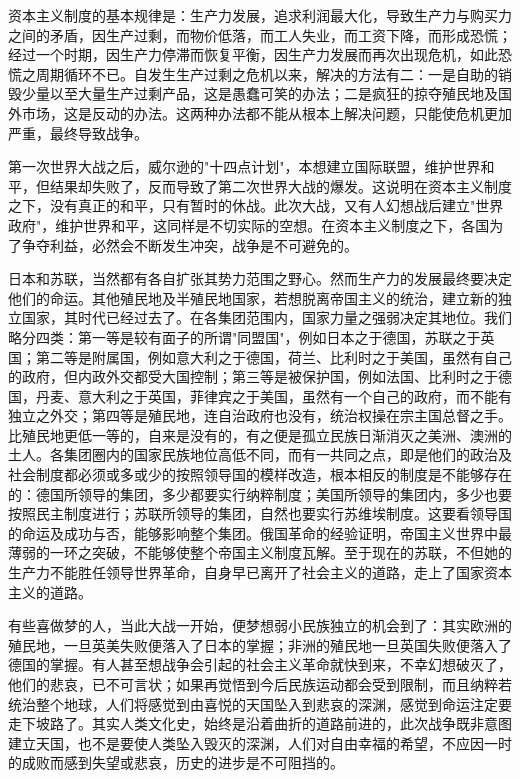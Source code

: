 \documentclass[
  openany,           %
  12pt,              %
  a4paper            %
]{ctexbook}
\begin{document}
资本主义制度的基本规律是：生产力发展，追求利润最大化，导致生产力与购买力之间的矛盾，因生产过剩，而物价低落，而工人失业，而工资下降，而形成恐慌；经过一个时期，因生产力停滞而恢复平衡，因生产力发展而再次出现危机，如此恐慌之周期循环不已。自发生生产过剩之危机以来，解决的方法有二：一是自助的销毁少量以至大量生产过剩产品，这是愚蠢可笑的办法；二是疯狂的掠夺殖民地及国外市场，这是反动的办法。这两种办法都不能从根本上解决问题，只能使危机更加严重，最终导致战争。

第一次世界大战之后，威尔逊的"十四点计划"，本想建立国际联盟，维护世界和平，但结果却失败了，反而导致了第二次世界大战的爆发。这说明在资本主义制度之下，没有真正的和平，只有暂时的休战。此次大战，又有人幻想战后建立"世界政府"，维护世界和平，这同样是不切实际的空想。在资本主义制度之下，各国为了争夺利益，必然会不断发生冲突，战争是不可避免的。

日本和苏联，当然都有各自扩张其势力范围之野心。然而生产力的发展最终要决定他们的命运。其他殖民地及半殖民地国家，若想脱离帝国主义的统治，建立新的独立国家，其时代已经过去了。在各集团范围内，国家力量之强弱决定其地位。我们略分四类：第一等是较有面子的所谓"同盟国"，例如日本之于德国，苏联之于英国；第二等是附属国，例如意大利之于德国，荷兰、比利时之于美国，虽然有自己的政府，但内政外交都受大国控制；第三等是被保护国，例如法国、比利时之于德国，丹麦、意大利之于英国，菲律宾之于美国，虽然有一个自己的政府，而不能有独立之外交；第四等是殖民地，连自治政府也没有，统治权操在宗主国总督之手。比殖民地更低一等的，自来是没有的，有之便是孤立民族日渐消灭之美洲、澳洲的土人。各集团圈内的国家民族地位高低不同，而有一共同之点，即是他们的政治及社会制度都必须或多或少的按照领导国的模样改造，根本相反的制度是不能够存在的：德国所领导的集团，多少都要实行纳粹制度；美国所领导的集团内，多少也要按照民主制度进行；苏联所领导的集团，自然也要实行苏维埃制度。这要看领导国的命运及成功与否，能够影响整个集团。俄国革命的经验证明，帝国主义世界中最薄弱的一环之突破，不能够使整个帝国主义制度瓦解。至于现在的苏联，不但她的生产力不能胜任领导世界革命，自身早已离开了社会主义的道路，走上了国家资本主义的道路。

有些喜做梦的人，当此大战一开始，便梦想弱小民族独立的机会到了：其实欧洲的殖民地，一旦英美失败便落入了日本的掌握；非洲的殖民地一旦英国失败便落入了德国的掌握。有人甚至想战争会引起的社会主义革命就快到来，不幸幻想破灭了，他们的悲哀，已不可言状；如果再觉悟到今后民族运动都会受到限制，而且纳粹若统治整个地球，人们将感觉到由喜悦的天国坠入到悲哀的深渊，感觉到命运注定要走下坡路了。其实人类文化史，始终是沿着曲折的道路前进的，此次战争既非意图建立天国，也不是要使人类坠入毁灭的深渊，人们对自由幸福的希望，不应因一时的成败而感到失望或悲哀，历史的进步是不可阻挡的。
\end{document}
